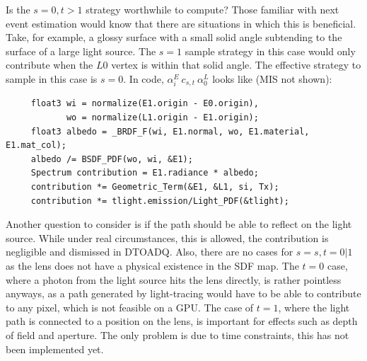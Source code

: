 \message{ !name(test.tex)}\documentclass{article}
\begin{document}
    Is the $s = 0, t > 1$
    strategy worthwhile to compute? Those familiar with next event
    estimation would know that there are situations in which this is beneficial.
    Take, for example, a glossy surface with a small solid angle subtending to
    the surface of a large light source. The $s=1$ sample strategy in this case
    would only contribute when the $L0$ vertex is within that solid angle.
    The effective strategy to sample in this case is $s = 0$.
    In code, $\alpha_i^E\:c_{s,t}\:\alpha_0^L$ looks like (MIS not shown):
    \begin{lstlisting}
     float3 wi = normalize(E1.origin - E0.origin),
            wo = normalize(L1.origin - E1.origin);
     float3 albedo = _BRDF_F(wi, E1.normal, wo, E1.material, E1.mat_col);
     albedo /= BSDF_PDF(wo, wi, &E1);
     Spectrum contribution = E1.radiance * albedo;
     contribution *= Geometric_Term(&E1, &L1, si, Tx);
     contribution *= tlight.emission/Light_PDF(&tlight);
    \end{lstlisting}
    
    Another question to consider is if the path should be able to reflect on the
    light source. While under real circumstances, this is allowed, the
    contribution is negligible and dismissed in DTOADQ. Also, there are no cases for $s = s, t = 0|1$ as
    the lens does not have a physical existence in the SDF map. The $t = 0$ case, where a photon from the light source hits the lens directly, is rather pointless anyways, as a path generated by light-tracing would have to be able to contribute to any pixel, which is not feasible on a GPU. The case of $t = 1$, where the light path is connected to a position on the lens, is important for effects such as depth of field and aperture. The only problem is due to time constraints, this has not been implemented yet.
\end{document}
